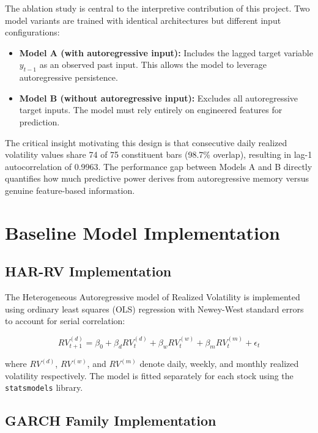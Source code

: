 The ablation study is central to the interpretive contribution of this project. Two model variants are trained with identical architectures but different input configurations:

\begin{itemize}
    \item \textbf{Model A (with autoregressive input):} Includes the lagged target variable $y_{t-1}$ as an observed past input. This allows the model to leverage autoregressive persistence.
    \item \textbf{Model B (without autoregressive input):} Excludes all autoregressive target inputs. The model must rely entirely on engineered features for prediction.
\end{itemize}

The critical insight motivating this design is that consecutive daily realized volatility values share 74 of 75 constituent bars (98.7\% overlap), resulting in lag-1 autocorrelation of 0.9963. The performance gap between Models A and B directly quantifies how much predictive power derives from autoregressive memory versus genuine feature-based information.

\section{Baseline Model Implementation}

\subsection{HAR-RV Implementation}

The Heterogeneous Autoregressive model of Realized Volatility \cite{corsi2009} is implemented using ordinary least squares (OLS) regression with Newey-West standard errors to account for serial correlation:

\begin{equation}
RV_{t+1}^{(d)} = \beta_0 + \beta_d RV_t^{(d)} + \beta_w RV_t^{(w)} + \beta_m RV_t^{(m)} + \epsilon_t
\end{equation}

where $RV^{(d)}$, $RV^{(w)}$, and $RV^{(m)}$ denote daily, weekly, and monthly realized volatility respectively. The model is fitted separately for each stock using the \texttt{statsmodels} library.

\subsection{GARCH Family Implementation}

